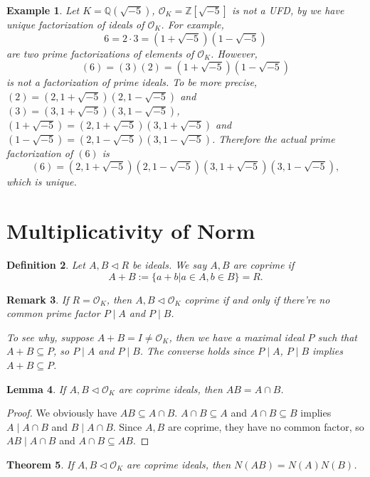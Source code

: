 \documentclass[11pt]{book}
\newtheorem{theorem}{Theorem}[section]
\newtheorem{definition}[theorem]{Definition}
\newtheorem{example}[theorem]{Example}
\newtheorem{lemma}[theorem]{Lemma}
\newtheorem{remark}[theorem]{Remark}
\begin{document}
\begin{example}
    Let $K=\mathbb{Q}(\sqrt{-5})$, $\mathcal{O}_{K}=\mathbb{Z}[\sqrt{-5}]$ is not a UFD, by we have unique factorization of ideals of $\mathcal{O}_{K}$. For example, 
    \[
    6=2\cdot 3=(1+\sqrt{-5})(1-\sqrt{-5})
    \]
    are two prime factorizations of elements of $\mathcal{O}_{K}$. However, 
    \[
    (6)=(3)(2)=(1+\sqrt{-5})(1-\sqrt{-5})
    \]
    is not a factorization of prime ideals. 
    To be more precise, $(2)=(2,1+\sqrt{-5})(2,1-\sqrt{-5})$ and $(3)=(3,1+\sqrt{-5})(3,1-\sqrt{-5})$, $(1+\sqrt{-5})=(2,1+\sqrt{-5})(3,1+\sqrt{-5})$ and $(1-\sqrt{-5})=(2,1-\sqrt{-5})(3,1-\sqrt{-5})$. 
    Therefore the actual prime factorization of $(6)$ is 
    \[
    (6)=(2,1+\sqrt{-5})(2,1-\sqrt{-5})(3,1+\sqrt{-5})(3,1-\sqrt{-5}),
    \]
    which is unique. 
\end{example}

\section{Multiplicativity of Norm}
\begin{definition}
    Let $A, B\lhd R$ be ideals. We say $A,B$ are coprime if 
    \[
    A+B:=\{a+b|a\in A, b\in B\}=R. 
    \]
\end{definition}

\begin{remark}
    If $R=\mathcal{O}_{K}$, then $A,B\lhd \mathcal{O}_{K}$ coprime if and only if there're no common prime factor $P\mid A$ and $P\mid B$. 

    To see why, suppose $A+B=I\neq \mathcal{O}_{K}$, then we have a maximal ideal $P$ such that $A+B\subseteq P$, so $P\mid A$ and $P\mid B$. The converse holds since $P\mid A$, $P\mid B$ implies $A+B\subseteq P$. 
\end{remark}

\begin{lemma}
    If $A,B\lhd \mathcal{O}_{K}$ are coprime ideals, then $AB=A\cap B$. 
\end{lemma}

\begin{proof}
    We obviously have $AB\subseteq A\cap B$. $A\cap B\subseteq A$ and $A\cap B\subseteq B$ implies $A\mid A\cap B$ and $B\mid A\cap B$. Since $A,B$ are coprime, they have no common factor, so $AB\mid A\cap B$ and $A\cap B\subseteq AB$. 
\end{proof}

\begin{theorem}
    If $A,B\lhd \mathcal{O}_{K}$ are coprime ideals, then $N(AB)=N(A)N(B)$. 
\end{theorem}
\end{document}
